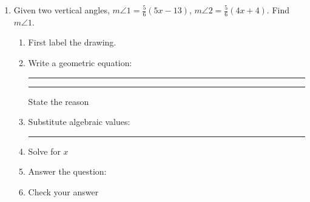 \begin{enumerate}
\newpage
  \item Given two vertical angles, $m \angle 1 = \frac{5}{6}(5x-13)$, $m \angle 2 = \frac{5}{6}(4x+4)$. Find $m \angle 1$.
  \begin{enumerate}
    \item First label the drawing.
    \begin{flushright}
    \end{flushright}
    \vspace{1cm}
    \item Write a geometric equation: \rule{4cm}{0.15mm} \hspace{1cm} \rule{4cm}{0.15mm}
    \begin{flushright} State the reason \end{flushright}
    \vspace{.7cm}
    \item Substitute algebraic values: \rule{4cm}{0.15mm}
    \item Solve for $x$
    \vspace{4cm}
    \item Answer the question:
    \vspace{3cm}
    \item Check your answer
  \end{enumerate}


\end{enumerate}
